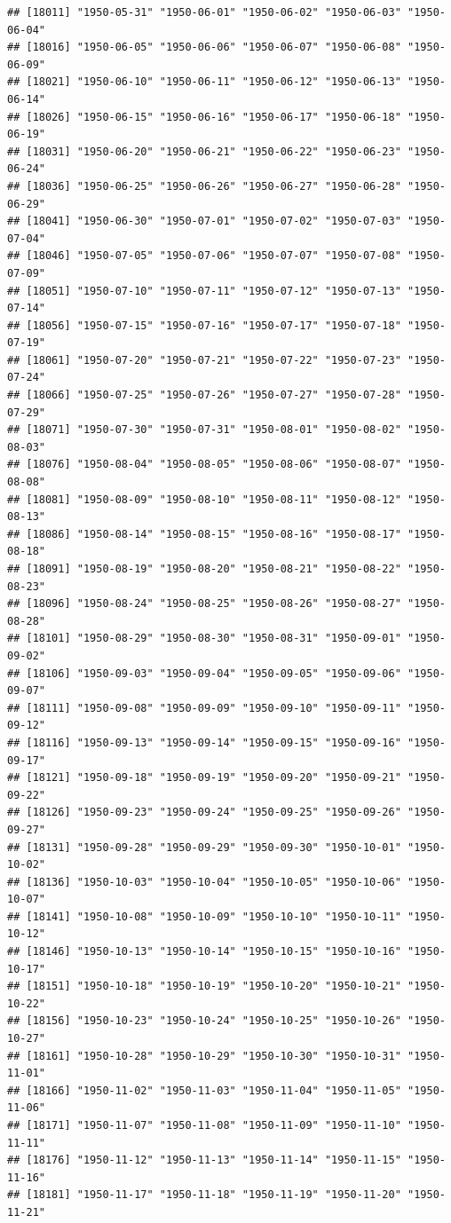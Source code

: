 \documentclass{article}\usepackage[]{graphicx}\usepackage[]{color}
\makeatletter
\newenvironment{kframe}{%
 \def\at@end@of@kframe{}%
 \ifinner\ifhmode%
  \def\at@end@of@kframe{\end{minipage}}%
  \begin{minipage}{\columnwidth}%
 \fi\fi%
 \def\FrameCommand##1{\hskip\@totalleftmargin \hskip-\fboxsep
 \colorbox{shadecolor}{##1}\hskip-\fboxsep
     \hskip-\linewidth \hskip-\@totalleftmargin \hskip\columnwidth}%
 \MakeFramed {\advance\hsize-\width
   \@totalleftmargin\z@ \linewidth\hsize
   \@setminipage}}%
 {\par\unskip\endMakeFramed%
 \at@end@of@kframe}
\newenvironment{knitrout}{}{} %
\makeatother
\begin{document}
\begin{description}
\begin{knitrout}
\begin{kframe}
\begin{verbatim}
## [18011] "1950-05-31" "1950-06-01" "1950-06-02" "1950-06-03" "1950-06-04"
## [18016] "1950-06-05" "1950-06-06" "1950-06-07" "1950-06-08" "1950-06-09"
## [18021] "1950-06-10" "1950-06-11" "1950-06-12" "1950-06-13" "1950-06-14"
## [18026] "1950-06-15" "1950-06-16" "1950-06-17" "1950-06-18" "1950-06-19"
## [18031] "1950-06-20" "1950-06-21" "1950-06-22" "1950-06-23" "1950-06-24"
## [18036] "1950-06-25" "1950-06-26" "1950-06-27" "1950-06-28" "1950-06-29"
## [18041] "1950-06-30" "1950-07-01" "1950-07-02" "1950-07-03" "1950-07-04"
## [18046] "1950-07-05" "1950-07-06" "1950-07-07" "1950-07-08" "1950-07-09"
## [18051] "1950-07-10" "1950-07-11" "1950-07-12" "1950-07-13" "1950-07-14"
## [18056] "1950-07-15" "1950-07-16" "1950-07-17" "1950-07-18" "1950-07-19"
## [18061] "1950-07-20" "1950-07-21" "1950-07-22" "1950-07-23" "1950-07-24"
## [18066] "1950-07-25" "1950-07-26" "1950-07-27" "1950-07-28" "1950-07-29"
## [18071] "1950-07-30" "1950-07-31" "1950-08-01" "1950-08-02" "1950-08-03"
## [18076] "1950-08-04" "1950-08-05" "1950-08-06" "1950-08-07" "1950-08-08"
## [18081] "1950-08-09" "1950-08-10" "1950-08-11" "1950-08-12" "1950-08-13"
## [18086] "1950-08-14" "1950-08-15" "1950-08-16" "1950-08-17" "1950-08-18"
## [18091] "1950-08-19" "1950-08-20" "1950-08-21" "1950-08-22" "1950-08-23"
## [18096] "1950-08-24" "1950-08-25" "1950-08-26" "1950-08-27" "1950-08-28"
## [18101] "1950-08-29" "1950-08-30" "1950-08-31" "1950-09-01" "1950-09-02"
## [18106] "1950-09-03" "1950-09-04" "1950-09-05" "1950-09-06" "1950-09-07"
## [18111] "1950-09-08" "1950-09-09" "1950-09-10" "1950-09-11" "1950-09-12"
## [18116] "1950-09-13" "1950-09-14" "1950-09-15" "1950-09-16" "1950-09-17"
## [18121] "1950-09-18" "1950-09-19" "1950-09-20" "1950-09-21" "1950-09-22"
## [18126] "1950-09-23" "1950-09-24" "1950-09-25" "1950-09-26" "1950-09-27"
## [18131] "1950-09-28" "1950-09-29" "1950-09-30" "1950-10-01" "1950-10-02"
## [18136] "1950-10-03" "1950-10-04" "1950-10-05" "1950-10-06" "1950-10-07"
## [18141] "1950-10-08" "1950-10-09" "1950-10-10" "1950-10-11" "1950-10-12"
## [18146] "1950-10-13" "1950-10-14" "1950-10-15" "1950-10-16" "1950-10-17"
## [18151] "1950-10-18" "1950-10-19" "1950-10-20" "1950-10-21" "1950-10-22"
## [18156] "1950-10-23" "1950-10-24" "1950-10-25" "1950-10-26" "1950-10-27"
## [18161] "1950-10-28" "1950-10-29" "1950-10-30" "1950-10-31" "1950-11-01"
## [18166] "1950-11-02" "1950-11-03" "1950-11-04" "1950-11-05" "1950-11-06"
## [18171] "1950-11-07" "1950-11-08" "1950-11-09" "1950-11-10" "1950-11-11"
## [18176] "1950-11-12" "1950-11-13" "1950-11-14" "1950-11-15" "1950-11-16"
## [18181] "1950-11-17" "1950-11-18" "1950-11-19" "1950-11-20" "1950-11-21"

\end{verbatim}
\end{kframe}
\end{knitrout}
\end{description}
\end{document}
